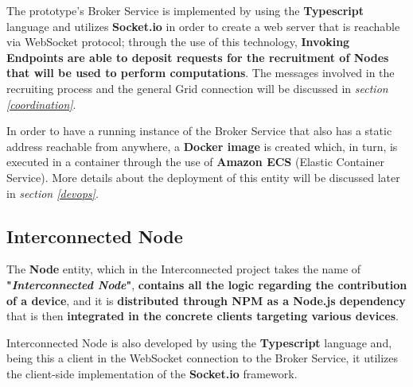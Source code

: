 The prototype's Broker Service is implemented by using the \textbf{Typescript} language and utilizes \textbf{Socket.io} in order to create a web server that is reachable via WebSocket protocol; through the use of this technology, \textbf{Invoking Endpoints are able to deposit requests for the recruitment of Nodes that will be used to perform computations}. The messages involved in the recruiting process and the general Grid connection will be discussed in \textit{section \ref{coordination}}.

In order to have a running instance of the Broker Service that also has a static address reachable from anywhere, a \textbf{Docker image} is created which, in turn, is executed in a container through the use of \textbf{Amazon ECS} (Elastic Container Service). More details about the deployment of this entity will be discussed later in \textit{section \ref{devops}}.

\subsection{Interconnected Node}\label{interconnected_node}
The \textbf{Node} entity, which in the Interconnected project takes the name of \textbf{"\textit{Interconnected Node}"}, \textbf{contains all the logic regarding the contribution of a device}, and it is \textbf{distributed through NPM as a Node.js dependency} that is then \textbf{integrated in the concrete clients targeting various devices}.

Interconnected Node is also developed by using the \textbf{Typescript} language and, being this a client in the WebSocket connection to the Broker Service, it utilizes the client-side implementation of the \textbf{Socket.io} framework.

